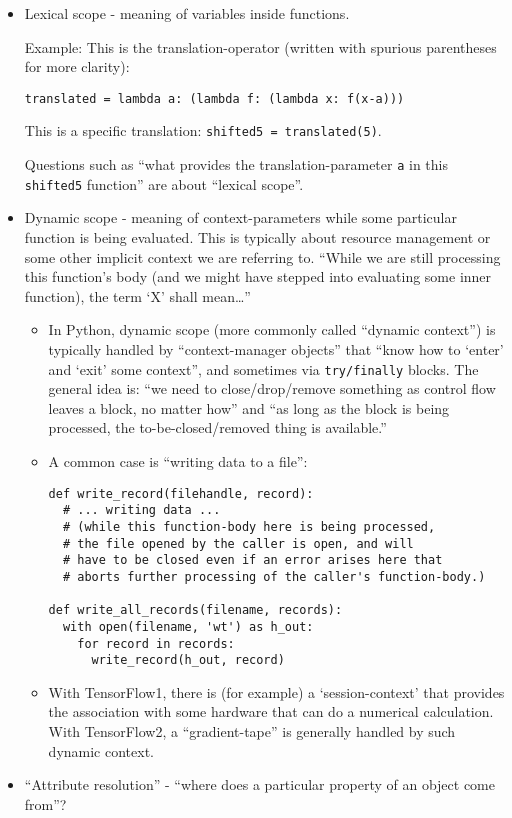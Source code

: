 \documentclass[11pt]{article}
\begin{document}
\begin{itemize}
\item
  Lexical scope - meaning of variables inside functions.

  Example: This is the translation-operator (written with spurious
  parentheses for more clarity):

  \texttt{translated\ =\ lambda\ a:\ (lambda\ f:\ (lambda\ x:\ f(x-a)))}

  This is a specific translation: \texttt{shifted5\ =\ translated(5)}.

  Questions such as ``what provides the translation-parameter \texttt{a}
  in this \texttt{shifted5} function'' are about ``lexical scope''.
\item
  Dynamic scope - meaning of context-parameters while some particular
  function is being evaluated. This is typically about resource
  management or some other implicit context we are referring to. ``While
  we are still processing this function's body (and we might have
  stepped into evaluating some inner function), the term `X' shall
  mean\ldots{}''

  \begin{itemize}
  \item
    In Python, dynamic scope (more commonly called ``dynamic context'')
    is typically handled by ``context-manager objects'' that ``know how
    to `enter' and `exit' some context'', and sometimes via
    \texttt{try/finally} blocks. The general idea is: ``we need to
    close/drop/remove something as control flow leaves a block, no
    matter how'' and ``as long as the block is being processed, the
    to-be-closed/removed thing is available.''
  \item
    A common case is ``writing data to a file'':

\begin{verbatim}
def write_record(filehandle, record):
  # ... writing data ...
  # (while this function-body here is being processed,
  # the file opened by the caller is open, and will
  # have to be closed even if an error arises here that
  # aborts further processing of the caller's function-body.)

def write_all_records(filename, records):
  with open(filename, 'wt') as h_out:
    for record in records:
      write_record(h_out, record)
\end{verbatim}
  \item
    With TensorFlow1, there is (for example) a `session-context' that
    provides the association with some hardware that can do a numerical
    calculation. With TensorFlow2, a ``gradient-tape'' is generally
    handled by such dynamic context.
  \end{itemize}
\item
  ``Attribute resolution'' - ``where does a particular property of an
  object come from''?


\end{itemize}
\end{document}
